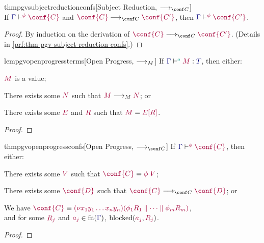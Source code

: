 \documentclass[main.tex]{subfiles}
\begin{document}
\begin{restatabletheorem}{thmpgvsubjectreductionconfs}[Subject Reduction, $\cred$]
  \label{thm:pgv-subject-reduction-confs}
  \hfill\\%
  If $\cseq[\phi]{\ty{\Gamma}}{\conf{C}}$ and $\tm{\conf{C}}\cred\tm{\conf{C'}}$,
  then $\cseq[\phi]{\ty{\Gamma}}{\conf{C'}}$.
\end{restatabletheorem}
\begin{proof}
  By induction on the derivation of $\tm{\conf{C}}\cred\tm{\conf{C'}}$.
  (Details in \cref{prf:thm-pgv-subject-reduction-confs}.)
\end{proof}

\begin{restatablelemma}{lempgvopenprogressterms}[Open Progress, $\longrightarrow_{M}$]
  \label{lem:pgv-open-progress-terms}
  If $\tseq[\cs{o}]{\ty{\Gamma}}{M}{T}$, then either:
  \begin{description}[labelwidth=8ex]
  \item[Done]
    $\tm{M}$ is a value;
  \item[Step]
    There exists some $\tm{N}$ such that $\tm{M}\tred\tm{N}$; or
  \item[Blocked]
    There exists some $\tm{E}$ and $\tm{R}$ such that $\tm{M}=\tm{\plug{E}{R}}$.
  \end{description}
\end{restatablelemma}
\begin{proof}
  \admit
\end{proof}

\begin{restatabletheorem}{thmpgvopenprogressconfs}[Open Progress, $\cred$]
  \label{thm:pgv-open-progress-confs}
  If $\cseq[\phi]{\ty{\Gamma}}{\conf{C}}$, then either:
  \begin{description}[labelwidth=8ex]
  \item[Done]
    There exists some $\tm{V}$ such that $\tm{\conf{C}}=\tm{\phi\;V}$;
  \item[Step]
    There exists some $\tm{\conf{D}}$ such that $\tm{\conf{C}} \cred \tm{\conf{D}}$; or
  \item[Blocked]
    We have $\tm{\conf{C}}\equiv\tm{\res{x_1y_1\dots x_ny_n}{}{(\phi_1R_1 \parallel\dots\parallel \phi_mR_m)}}$,\\
    and for some $\tm{R_j}$ and $\tm{a_j}\in\fn(\ty{\Gamma})$, $\blocked(\tm{a_j},\tm{R_j})$.
  \end{description}
\end{restatabletheorem}
\begin{proof}
  \admit
\end{proof}
\end{document}
